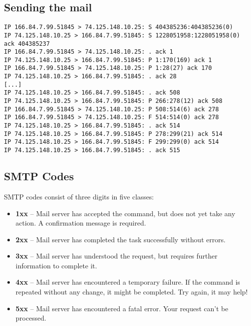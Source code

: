 \documentclass[xga]{xdvislides}
\begin{document}
\subsection{Sending the mail}
\begin{verbatim}
IP 166.84.7.99.51845 > 74.125.148.10.25: S 404385236:404385236(0)
IP 74.125.148.10.25 > 166.84.7.99.51845: S 1228051958:1228051958(0) ack 404385237
IP 166.84.7.99.51845 > 74.125.148.10.25: . ack 1
IP 74.125.148.10.25 > 166.84.7.99.51845: P 1:170(169) ack 1
IP 166.84.7.99.51845 > 74.125.148.10.25: P 1:28(27) ack 170
IP 74.125.148.10.25 > 166.84.7.99.51845: . ack 28
[...]
IP 74.125.148.10.25 > 166.84.7.99.51845: . ack 508
IP 74.125.148.10.25 > 166.84.7.99.51845: P 266:278(12) ack 508
IP 166.84.7.99.51845 > 74.125.148.10.25: P 508:514(6) ack 278
IP 166.84.7.99.51845 > 74.125.148.10.25: F 514:514(0) ack 278
IP 74.125.148.10.25 > 166.84.7.99.51845: . ack 514
IP 74.125.148.10.25 > 166.84.7.99.51845: P 278:299(21) ack 514
IP 74.125.148.10.25 > 166.84.7.99.51845: F 299:299(0) ack 514
IP 74.125.148.10.25 > 166.84.7.99.51845: . ack 515
\end{verbatim}
\Normalsize

\subsection{SMTP Codes}
SMTP codes consist of three digits in five classes:
\begin{itemize}
	\item {\bf 1xx} --  Mail server has accepted the command, but does not yet
		take any action. A confirmation message is required.
	\item {\bf 2xx} --  Mail server has completed the task successfully
		without errors.
	\item {\bf 3xx} --  Mail server has understood the request, but requires
		further information to complete it.
	\item {\bf 4xx} --  Mail server has encountered a temporary failure. If
		the command is repeated without any change, it might be
		completed. Try again, it may help!
	\item {\bf 5xx} --  Mail server has encountered a fatal error. Your
		request can't be processed.
\end{itemize}
\end{document}
